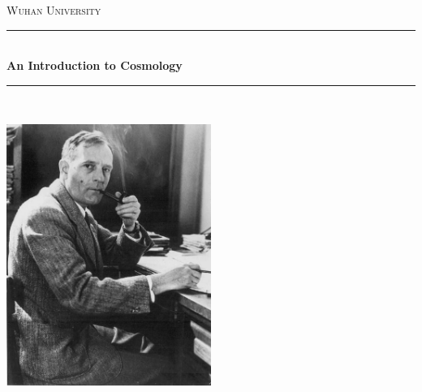 \begin{titlepage}

\newcommand{\HRule}{\rule{\linewidth}{0.5mm}} %
\center %
 

\textsc{\LARGE Wuhan University}\\[1.5cm] %



\HRule \\[0.4cm]
{ \huge \bfseries An Introduction to Cosmology}\\[0.4cm] %
\HRule \\[1.5cm]
 

\begin{minipage}{0.4\textwidth}
\end{minipage}


\vfill %
\includegraphics[width=0.5\textwidth]{figures/Hubble}\\[1cm]
\end{titlepage}


